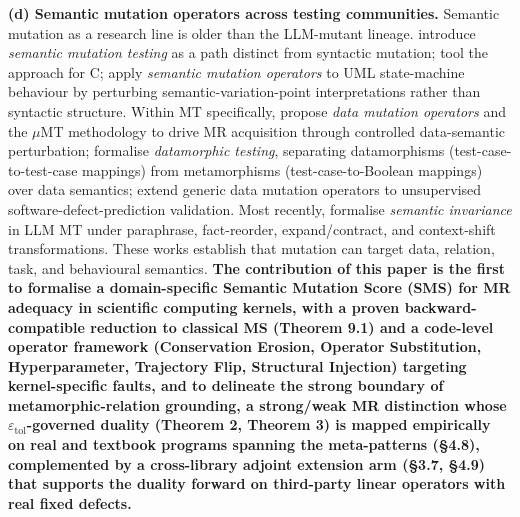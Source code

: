 \documentclass[manuscript,screen,review]{acmart}
\begin{document}
\textbf{(d) Semantic mutation operators across testing communities.}
Semantic mutation as a research line is older than the LLM-mutant
lineage. \citet{7a6c280d9584691800e71876c716ea229335abeb} introduce \emph{semantic
mutation testing} as a path distinct from syntactic mutation; \citet{dan2012smtc}
tool the approach for C; \citet{derezinska2019uml}
apply \emph{semantic mutation operators} to UML state-machine behaviour
by perturbing semantic-variation-point interpretations rather than
syntactic structure. Within MT specifically, \citet{sun2016mumt,sun2024datamutation}
propose \emph{data mutation operators} and the $\mu$MT methodology to drive
MR acquisition through controlled data-semantic perturbation; \citet{zhu2020datamorphic}
formalise \emph{datamorphic testing}, separating
datamorphisms (test-case-to-test-case mappings) from metamorphisms
(test-case-to-Boolean mappings) over data semantics; \citet{chan2024metamorphic}
extend generic data mutation operators to unsupervised
software-defect-prediction validation. Most recently, \citet{0fa97cc4e2a0ffb6a777669b1b541c0372fac0d2}
formalise \emph{semantic invariance} in LLM MT under paraphrase,
fact-reorder, expand/contract, and context-shift transformations. These
works establish that mutation can target data, relation, task, and
behavioural semantics. \textbf{The contribution of this paper is the
first to formalise a domain-specific Semantic Mutation Score (SMS) for
MR adequacy in scientific computing kernels, with a proven
backward-compatible reduction to classical MS (Theorem 9.1) and a
code-level operator framework (Conservation Erosion, Operator
Substitution, Hyperparameter, Trajectory Flip, Structural Injection)
targeting kernel-specific faults, and to delineate the strong boundary
of metamorphic-relation grounding, a strong/weak MR distinction whose
$\varepsilon_{\mathrm{tol}}$-governed duality (Theorem 2, Theorem 3)
is mapped empirically on real and textbook programs spanning the
meta-patterns (§4.8), complemented by a cross-library adjoint extension
arm (§3.7, §4.9) that supports the duality forward on third-party
linear operators with real fixed defects.}
\end{document}
